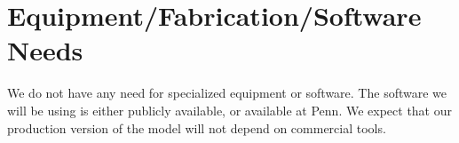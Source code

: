 \documentclass[12pt]{article}
\begin{document}
\addtocounter{section}{1} %

\section{Equipment/Fabrication/Software Needs}
We do not have any need for specialized equipment or software. The
software we will be using is either publicly available, or available
at Penn. We expect that our production version of the model will not
depend on commercial tools.

\addtocounter{section}{1} %
\end{document}
